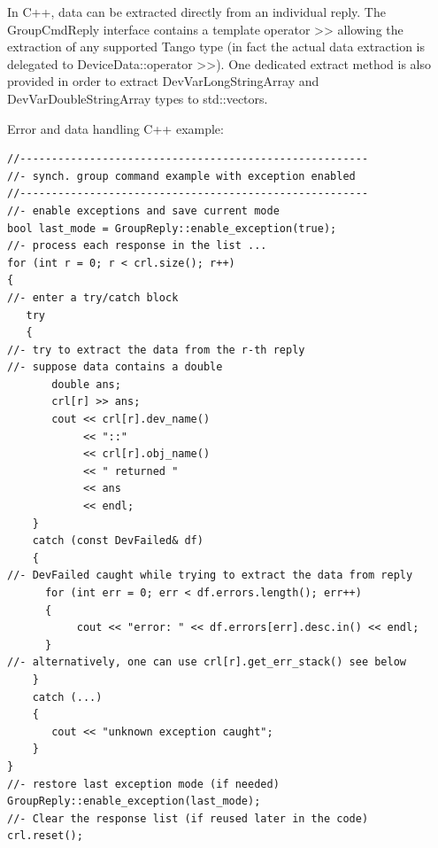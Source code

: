 In C++, data can be extracted directly from an individual reply. The
GroupCmdReply interface contains a template operator >\textcompwordmark{}>
allowing the extraction of any supported Tango type (in fact the actual
data extraction is delegated to DeviceData::operator >\textcompwordmark{}>).
One dedicated extract method is also provided in order to extract
DevVarLongStringArray and DevVarDoubleStringArray types to std::vectors.

Error and data handling C++ example:


\begin{verbatim}
//-------------------------------------------------------
//- synch. group command example with exception enabled
//-------------------------------------------------------
//- enable exceptions and save current mode
bool last_mode = GroupReply::enable_exception(true);
//- process each response in the list ...
for (int r = 0; r < crl.size(); r++)
{
//- enter a try/catch block
   try
   {
//- try to extract the data from the r-th reply
//- suppose data contains a double
       double ans;
       crl[r] >> ans;
       cout << crl[r].dev_name()
            << "::"
            << crl[r].obj_name()
            << " returned "
            << ans
            << endl;
    }
    catch (const DevFailed& df)
    {
//- DevFailed caught while trying to extract the data from reply
      for (int err = 0; err < df.errors.length(); err++)
      {
           cout << "error: " << df.errors[err].desc.in() << endl;
      }
//- alternatively, one can use crl[r].get_err_stack() see below
    }
    catch (...)
    {
       cout << "unknown exception caught";
    }
}
//- restore last exception mode (if needed)
GroupReply::enable_exception(last_mode);
//- Clear the response list (if reused later in the code)
crl.reset();
 


\end{verbatim}
